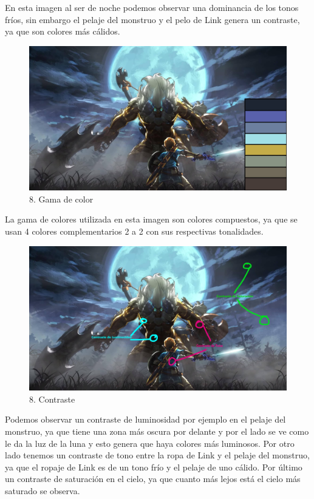 \documentclass[12pt]{article}
\begin{document}
En esta imagen al ser de noche podemos observar una dominancia de los tonos fríos, sin embargo el pelaje del monstruo y el pelo de Link genera un contraste, ya que son colores más cálidos.

\begin{figure}[H]
      \centering
      \includegraphics[scale=0.25]{images/Raúl/Sección 8/Imagen 8 colores.jpg}
      \caption{\small 8. Gama de color}
    \end{figure}

 La gama de colores utilizada en esta imagen son colores compuestos, ya que se usan 4 colores complementarios 2 a 2 con sus respectivas tonalidades.

\begin{figure}[H]
      \centering
      \includegraphics[scale=0.25]{images/Raúl/Sección 8/Imagen 8 contraste.jpg}
      \caption{\small 8. Contraste}
    \end{figure}

Podemos observar un contraste de luminosidad por ejemplo en el pelaje del monstruo, ya que tiene una zona más oscura por delante y por el lado se ve como le da la luz de la luna y esto genera que haya colores más luminosos. Por otro lado tenemos un contraste de tono entre la ropa de Link y el pelaje del monstruo, ya que el ropaje de Link es de un tono frío y el pelaje de uno cálido. Por último un contraste de saturación en el cielo, ya que cuanto más lejos está el cielo más saturado se observa.
\end{document}
